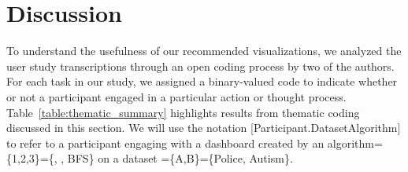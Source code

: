 \section{Discussion}
To understand the usefulness of our recommended visualizations, we analyzed the user study transcriptions through an open coding process by two of the authors. For each task in our study, we assigned a binary-valued code to indicate whether or not a participant engaged in a particular action or thought process. Table~\ref{table:thematic_summary} highlights results from thematic coding discussed in this section. We will use the notation [Participant.DatasetAlgorithm] to refer to a participant engaging with a dashboard created by an algorithm=\{1,2,3\}=\{\system, \cluster, \textsc{BFS}\} on a dataset =\{A,B\}=\{Police, Autism\}.
